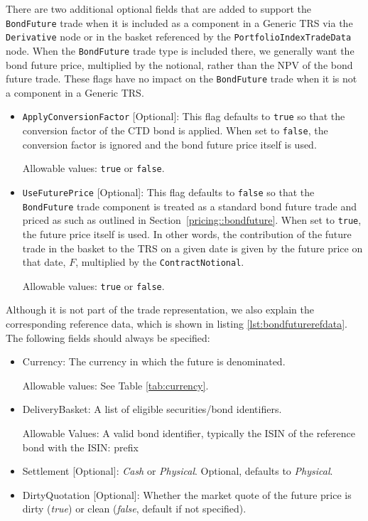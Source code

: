 There are two additional optional fields that are added to support the \lstinline!BondFuture! trade when it is included 
as a component in a Generic TRS via the \lstinline!Derivative! node or in the basket referenced by the 
\lstinline!PortfolioIndexTradeData! node. When the \lstinline!BondFuture! trade type is included there, we generally 
want the bond future price, multiplied by the notional, rather than the NPV of the bond future trade. These flags have 
no impact on the \lstinline!BondFuture! trade when it is not a component in a Generic TRS.
\begin{itemize}
\item \lstinline!ApplyConversionFactor! [Optional]:
  This flag defaults to \lstinline!true! so that the conversion factor of the CTD bond is applied.
  When set to \lstinline!false!, the conversion factor is ignored and the bond future price itself is used.

  Allowable values: \lstinline!true! or \lstinline!false!.

\item \lstinline!UseFuturePrice! [Optional]:
  This flag defaults to \lstinline!false! so that the \lstinline!BondFuture! trade component is treated as a standard 
  bond future trade and priced as such as outlined in Section~\ref{pricing::bondfuture}.
  When set to \lstinline!true!, the future price itself is used. In other words, the contribution of the future trade 
  in the basket to the TRS on a given date is given by the future price on that date, $F$, multiplied by the 
  \lstinline!ContractNotional!.

  Allowable values: \lstinline!true! or \lstinline!false!.

\end{itemize}

Although it is not part of the trade representation, we also explain the corresponding reference data, which is shown in
listing \ref{lst:bondfuturerefdata}. The following fields should always be specified:

\begin{itemize}
  \item Currency: The currency in which the future is denominated.

  Allowable values: See Table \ref{tab:currency}.
  \item DeliveryBasket: A list of eligible securities/bond identifiers.

  Allowable Values: A valid bond identifier, typically the ISIN of the reference bond with the ISIN: prefix
  \item Settlement [Optional]: \emph{Cash} or \emph{Physical}. Optional, defaults to \emph{Physical}.
  \item DirtyQuotation [Optional]: Whether the market quote of the future price is dirty (\emph{true}) or clean (\emph{false}, default if not specified).
\end{itemize}

